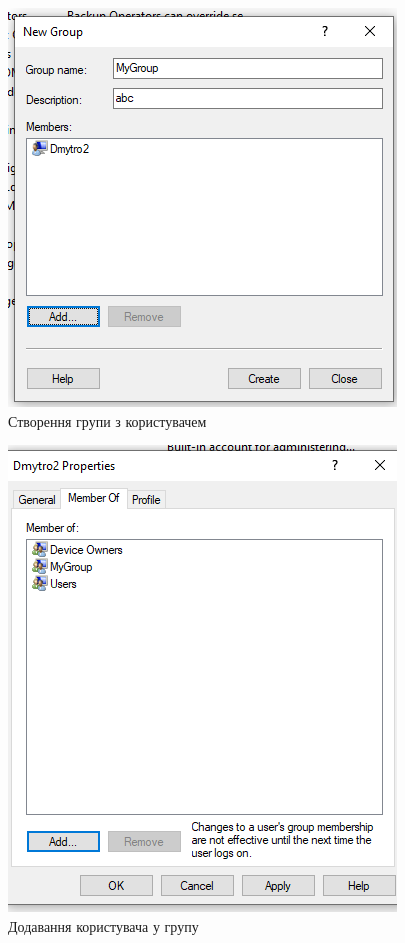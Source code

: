 \documentclass[oneside,14pt]{extarticle}
\begin{document}
\begin{normalsize}
	\begin{figure}[H]
		\centering
		\includegraphics[scale=0.6]{4}
		\caption{Створення групи з користувачем}
	\end{figure}
	
	\begin{figure}[H]
		\centering
		\includegraphics[scale=0.6]{5}
		\caption{Додавання користувача у групу}
	\end{figure}
	

\end{normalsize}
\end{document}
